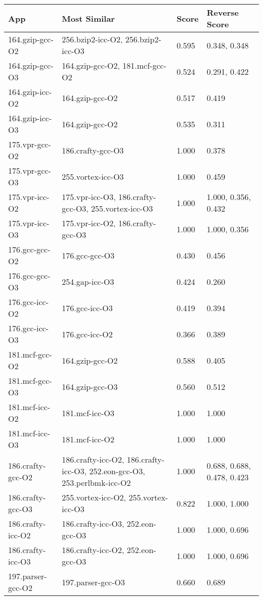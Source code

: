 \begin{table}
\center
\scriptsize
\begin{tabular}{|p{1.5in}|p{1.5in}|p{0.5in}|p{1.0in}|}
\hline
    App&Most Similar&Score&Reverse Score\\
\hline\hline
    164.gzip-gcc-O2&256.bzip2-icc-O2, 256.bzip2-icc-O3&0.595&0.348, 0.348\\
\hline
    164.gzip-gcc-O3&164.gzip-gcc-O2, 181.mcf-gcc-O2&0.524&0.291, 0.422\\
\hline
    164.gzip-icc-O2&164.gzip-gcc-O2&0.517&0.419\\
\hline
    164.gzip-icc-O3&164.gzip-gcc-O2&0.535&0.311\\
\hline
    175.vpr-gcc-O2&186.crafty-gcc-O3&1.000&0.378\\
\hline
    175.vpr-gcc-O3&255.vortex-icc-O3&1.000&0.459\\
\hline
    175.vpr-icc-O2&175.vpr-icc-O3, 186.crafty-gcc-O3, 255.vortex-icc-O3&1.000&1.000, 0.356, 0.432\\
\hline
    175.vpr-icc-O3&175.vpr-icc-O2, 186.crafty-gcc-O3&1.000&1.000, 0.356\\
\hline
    176.gcc-gcc-O2&176.gcc-gcc-O3&0.430&0.456\\
\hline
    176.gcc-gcc-O3&254.gap-icc-O3&0.424&0.260\\
\hline
    176.gcc-icc-O2&176.gcc-icc-O3&0.419&0.394\\
\hline
    176.gcc-icc-O3&176.gcc-icc-O2&0.366&0.389\\
\hline
    181.mcf-gcc-O2&164.gzip-gcc-O2&0.588&0.405\\
\hline
    181.mcf-gcc-O3&164.gzip-gcc-O3&0.560&0.512\\
\hline
    181.mcf-icc-O2&181.mcf-icc-O3&1.000&1.000\\
\hline
    181.mcf-icc-O3&181.mcf-icc-O2&1.000&1.000\\
\hline
    186.crafty-gcc-O2&186.crafty-icc-O2, 186.crafty-icc-O3, 252.eon-gcc-O3, 253.perlbmk-icc-O2&1.000&0.688, 0.688, 0.478, 0.423\\
\hline
    186.crafty-gcc-O3&255.vortex-icc-O2, 255.vortex-icc-O3&0.822&1.000, 1.000\\
\hline
    186.crafty-icc-O2&186.crafty-icc-O3, 252.eon-gcc-O3&1.000&1.000, 0.696\\
\hline
    186.crafty-icc-O3&186.crafty-icc-O2, 252.eon-gcc-O3&1.000&1.000, 0.696\\
\hline
    197.parser-gcc-O2&197.parser-gcc-O3&0.660&0.689\\

\end{tabular}
\end{table}
